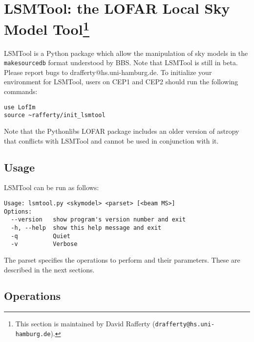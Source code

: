 \documentclass[structabstract]{article}
\begin{document}

\section[LSMTool: the LOFAR Local Sky Model Tool]{LSMTool: the LOFAR Local Sky Model Tool\footnote{This section is maintained by David Rafferty ({\tt drafferty@hs.uni-hamburg.de}).}}
\label{lsmtool}

LSMTool is a Python package which allow the manipulation of sky models in the \texttt{makesourcedb} format understood by BBS. Note that LSMTool is still in beta. Please report bugs to drafferty@hs.uni-hamburg.de. To initialize your environment for LSMTool, users on CEP1 and CEP2 should run the following commands:
\begin{verbatim}
use LofIm
source ~rafferty/init_lsmtool
\end{verbatim}
Note that the Pythonlibs LOFAR package includes an older version of astropy that conflicts with LSMTool and cannot be used in conjunction with it.

\subsection{Usage}
\label{lsmtool:usage}

LSMTool can be run as follows:
\begin{verbatim}
Usage: lsmtool.py <skymodel> <parset> [<beam MS>]
Options:
  --version   show program's version number and exit
  -h, --help  show this help message and exit
  -q          Quiet
  -v          Verbose
\end{verbatim}
The parset specifies the operations to perform and their parameters. These are described in the next sections.

\subsection{Operations}
\label{lsmtool:operations}
\end{document}
